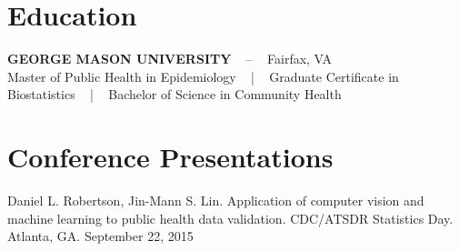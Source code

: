 \documentclass[a4paper,skipsamekey,11pt,english]{curve}
\newcommand{\makeFooter}[4]{
  \fancyfoot[R]{
    \color{base1}{
      #1 ~ | ~ #2 ~ | ~ #3 ~ | ~ #4 ~ | ~ $\thepage$ of $2$
    }
  }
}
\begin{document}
  \section{Education}
  \begin{tcolorbox}[colback=base1!10,colframe=base1!10,frame hidden]
    {\color{base03}\textbf{GEORGE MASON UNIVERSITY}} ~ – ~ Fairfax, VA\\
    \small Master of Public Health in Epidemiology ~ | ~
    Graduate Certificate in Biostatistics ~ | ~
    Bachelor of Science in Community Health
  \end{tcolorbox}

  \section{Conference Presentations}
  \begin{tcolorbox}[colback=base1!10,colframe=base1!10,frame hidden]
    Daniel L. Robertson, Jin-Mann S. Lin. Application of computer vision and
    machine learning to public health data validation. CDC/ATSDR Statistics
    Day. Atlanta, GA. September 22, 2015
  \end{tcolorbox}

  \makeFooter{Daniel Robertson}{Waynesboro, VA}{571-451-9241}{dan@dlrobertson.com}
\end{document}
